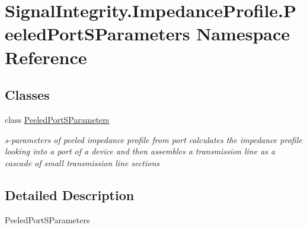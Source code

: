 \hypertarget{namespaceSignalIntegrity_1_1ImpedanceProfile_1_1PeeledPortSParameters}{}\section{Signal\+Integrity.\+Impedance\+Profile.\+Peeled\+Port\+S\+Parameters Namespace Reference}
\label{namespaceSignalIntegrity_1_1ImpedanceProfile_1_1PeeledPortSParameters}
\subsection*{Classes}
\begin{DoxyCompactItemize}
\item 
class \hyperlink{classSignalIntegrity_1_1ImpedanceProfile_1_1PeeledPortSParameters_1_1PeeledPortSParameters}{Peeled\+Port\+S\+Parameters}
\begin{DoxyCompactList}\small\item\em s-\/parameters of peeled impedance profile from port calculates the impedance profile looking into a port of a device and then assembles a transmission line as a cascade of small transmission line sections \end{DoxyCompactList}\end{DoxyCompactItemize}


\subsection{Detailed Description}
\begin{DoxyVerb}PeeledPortSParameters\end{DoxyVerb}
 